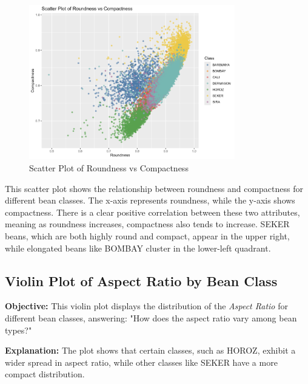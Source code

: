 \documentclass[a4paper,12pt]{article}
\begin{document}
\begin{figure}[H]
    \centering
    \includegraphics[width=0.8\textwidth]{graphs/scatter_roundness_compactness.png}
    \caption{Scatter Plot of Roundness vs Compactness}
    \label{fig:scatter_roundness_compactness}
\end{figure}
This scatter plot shows the relationship between roundness and compactness for different bean classes. The x-axis represents roundness, while the y-axis shows compactness. There is a clear positive correlation between these two attributes, meaning as roundness increases, compactness also tends to increase. SEKER beans, which are both highly round and compact, appear in the upper right, while elongated beans like BOMBAY cluster in the lower-left quadrant.

\newpage

\subsection{Violin Plot of Aspect Ratio by Bean Class}
\noindent\textbf{Objective:} This violin plot displays the distribution of the \textit{Aspect Ratio} for different bean classes, answering: "How does the aspect ratio vary among bean types?"

\noindent\textbf{Explanation:} The plot shows that certain classes, such as HOROZ, exhibit a wider spread in aspect ratio, while other classes like SEKER have a more compact distribution.
\end{document}
